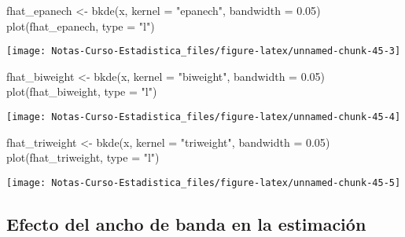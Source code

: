 \documentclass[
  12pt,
]{book}
\newenvironment{Shaded}{\begin{snugshade}}{\end{snugshade}}
\newcommand{\AttributeTok}[1]{\textcolor[rgb]{0.77,0.63,0.00}{#1}}
\newcommand{\FloatTok}[1]{\textcolor[rgb]{0.00,0.00,0.81}{#1}}
\newcommand{\FunctionTok}[1]{\textcolor[rgb]{0.00,0.00,0.00}{#1}}
\newcommand{\NormalTok}[1]{#1}
\newcommand{\OtherTok}[1]{\textcolor[rgb]{0.56,0.35,0.01}{#1}}
\newcommand{\StringTok}[1]{\textcolor[rgb]{0.31,0.60,0.02}{#1}}
\theoremstyle{definition}
\theoremstyle{definition}
\theoremstyle{definition}
\theoremstyle{definition}
\theoremstyle{remark}
\begin{document}
\begin{Shaded}
\begin{Highlighting}[]
\NormalTok{fhat\_epanech }\OtherTok{\textless{}{-}} \FunctionTok{bkde}\NormalTok{(x, }\AttributeTok{kernel =} \StringTok{"epanech"}\NormalTok{, }\AttributeTok{bandwidth =} \FloatTok{0.05}\NormalTok{)}
\FunctionTok{plot}\NormalTok{(fhat\_epanech, }\AttributeTok{type =} \StringTok{"l"}\NormalTok{)}
\end{Highlighting}
\end{Shaded}

\begin{center}\texttt{[image: Notas-Curso-Estadistica\_files/figure-latex/unnamed-chunk-45-3]} \end{center}

\begin{Shaded}
\begin{Highlighting}[]
\NormalTok{fhat\_biweight }\OtherTok{\textless{}{-}} \FunctionTok{bkde}\NormalTok{(x, }\AttributeTok{kernel =} \StringTok{"biweight"}\NormalTok{, }\AttributeTok{bandwidth =} \FloatTok{0.05}\NormalTok{)}
\FunctionTok{plot}\NormalTok{(fhat\_biweight, }\AttributeTok{type =} \StringTok{"l"}\NormalTok{)}
\end{Highlighting}
\end{Shaded}

\begin{center}\texttt{[image: Notas-Curso-Estadistica\_files/figure-latex/unnamed-chunk-45-4]} \end{center}

\begin{Shaded}
\begin{Highlighting}[]
\NormalTok{fhat\_triweight }\OtherTok{\textless{}{-}} \FunctionTok{bkde}\NormalTok{(x, }\AttributeTok{kernel =} \StringTok{"triweight"}\NormalTok{, }\AttributeTok{bandwidth =} \FloatTok{0.05}\NormalTok{)}
\FunctionTok{plot}\NormalTok{(fhat\_triweight, }\AttributeTok{type =} \StringTok{"l"}\NormalTok{)}
\end{Highlighting}
\end{Shaded}

\begin{center}\texttt{[image: Notas-Curso-Estadistica\_files/figure-latex/unnamed-chunk-45-5]} \end{center}

\hypertarget{efecto-del-ancho-de-banda-en-la-estimaciuxf3n}{%
\subsection{Efecto del ancho de banda en la estimación}\label{efecto-del-ancho-de-banda-en-la-estimaciuxf3n}}
\end{document}
